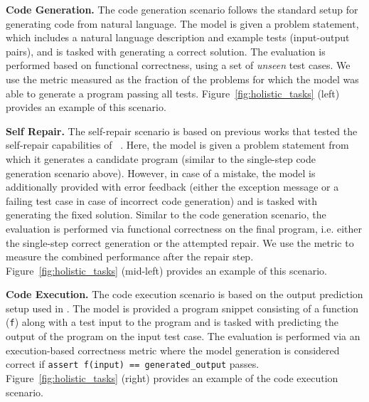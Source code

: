 \vspace{3pt}
\noindent \textbf{Code Generation.}
The code generation scenario follows the standard setup for generating code from natural language.
The model is given a problem statement, which includes a natural language description and example tests (input-output pairs), and is tasked with generating a correct solution.
The evaluation is performed based on functional correctness, using a set of \textit{unseen} test cases. 
We use the  metric measured as the fraction of the problems for which the model was able to generate a program passing all tests.
Figure~\ref{fig:holistic_tasks} (left) provides an example of this scenario.

\vspace{3pt}
\noindent \textbf{Self Repair.}
The self-repair scenario is based on previous works that tested the self-repair capabilities of \llms{}~\citep{olausson2023demystifying,shinn2023reflexion,chen2023teaching}. 
Here, the model is given a problem statement from which it generates a candidate program (similar to the single-step code generation scenario above). 
However, in case of a mistake, the model is additionally provided with error feedback (either the exception message or a failing test case in case of incorrect code generation) and is tasked with generating the fixed solution.
Similar to the code generation scenario, the evaluation is performed via functional correctness on the final program, i.e. either the single-step correct generation or the attempted repair.
We use the   metric to measure the combined performance after the repair step.
Figure~\ref{fig:holistic_tasks} (mid-left) provides an example of this scenario.


\vspace{3pt}
\noindent \textbf{Code Execution.} 
The code execution scenario is based on the output prediction setup used in \cruxeval{} \citep{gu2024cruxeval}. 
The model is provided a program snippet consisting of a function (\texttt{f}) along with a test input to the program and is tasked with predicting the output of the program on the input test case.
The evaluation is performed via an execution-based correctness metric where the model generation is considered correct if \texttt{assert f(input) == generated\_output} passes. 
Figure~\ref{fig:holistic_tasks} (right) provides an example of the code execution scenario.

